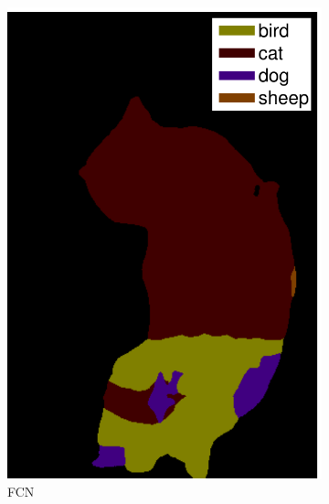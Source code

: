 \documentclass{article} %
\begin{document}
\begin{figure}[tbp]
\begin{subfigure}[b]{0.112\linewidth}
	\includegraphics[width=\linewidth]{figure/2009_002527_base-eps-converted-to.pdf}
	\caption{\footnotesize{FCN}}
	\label{fig:fcnoutput}
\end{subfigure}
\begin{subfigure}[b]{0.113\linewidth}

\end{subfigure}
\end{figure}
\end{document}
